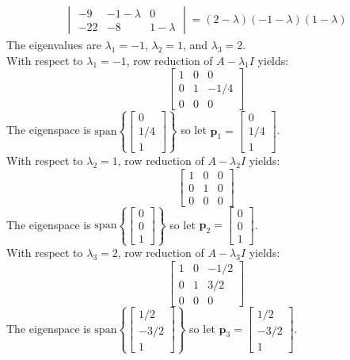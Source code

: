\documentclass{article}
\begin{document}
\begin{itemize}
\begin{align*}
\begin{vmatrix}
-9 & -1 - \lambda & 0 \\ 
-22 & -8 & 1 - \lambda
\end{vmatrix} = (2 - \lambda)(-1 - \lambda)(1 - \lambda)
\end{align*}
The eigenvalues are \(\lambda_1 = -1\), \(\lambda_2 = 1\), and \(\lambda_3 = 2\). \\
With respect to \(\lambda_1 = -1\), row reduction of \(A - \lambda_1 I\) yields: 
\[\begin{bmatrix} 
1 & 0 & 0 \\ 
0 & 1 & -1/4 \\
0 & 0 & 0 
\end{bmatrix}\]
The eigenspace is \(\text{span}\left\{\begin{bmatrix} 0 \\ 1/4 \\ 1 \end{bmatrix}\right\}\) so let \(\mathbf{p}_1 = \begin{bmatrix} 0 \\ 1/4 \\ 1 \end{bmatrix}\). \\
With respect to \(\lambda_2 = 1\), row reduction of \(A - \lambda_2 I\) yields: 
\[\begin{bmatrix} 
1 & 0 & 0 \\ 
0 & 1 & 0 \\
0 & 0 & 0 
\end{bmatrix}\]
The eigenspace is \(\text{span}\left\{\begin{bmatrix} 0 \\ 0 \\ 1 \end{bmatrix}\right\}\) so let \(\mathbf{p}_2 = \begin{bmatrix} 0 \\ 0 \\ 1 \end{bmatrix}\). \\
With respect to \(\lambda_3 = 2\), row reduction of \(A - \lambda_3 I\) yields: 
\[\begin{bmatrix} 
1 & 0 & -1/2 \\ 
0 & 1 & 3/2 \\
0 & 0 & 0 
\end{bmatrix}\]
The eigenspace is \(\text{span}\left\{\begin{bmatrix} 1/2 \\ -3/2 \\ 1 \end{bmatrix}\right\}\) so let \(\mathbf{p}_3 = \begin{bmatrix} 1/2 \\ -3/2 \\ 1 \end{bmatrix}\). \\

\end{itemize}
\end{document}
